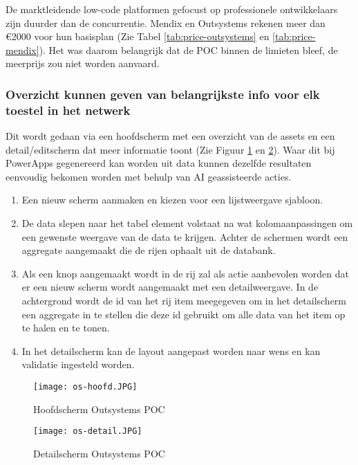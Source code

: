 De marktleidende low-code platformen gefocust op professionele ontwikkelaars zijn duurder dan de concurrentie. Mendix en Outsystems rekenen meer dan \euro2000 voor hun basisplan (Zie Tabel \ref{tab:price-outsystems} en \ref{tab:price-mendix}). Het was daarom belangrijk dat de POC binnen de limieten bleef, de meerprijs zou niet worden aanvaard.

\subsubsection{Overzicht kunnen geven van belangrijkste info voor elk toestel in het netwerk}

Dit wordt gedaan via een hoofdscherm met een overzicht van de assets en een detail/editscherm dat meer informatie toont (Zie Figuur \ref{fig:os-hoofd} en \ref{fig:os-detail}).
Waar dit bij PowerApps gegenereerd kan worden uit data kunnen dezelfde resultaten eenvoudig bekomen worden met behulp van AI geassisteerde acties.
\begin{enumerate}
    \item Een nieuw scherm aanmaken en kiezen voor een lijstweergave sjabloon.
    \item De data slepen naar het tabel element volstaat na wat kolomaanpassingen om een gewenste weergave van de data te krijgen. Achter de schermen wordt een aggregate aangemaakt die de rijen ophaalt uit de databank.
    \item Als een knop aangemaakt wordt in de rij zal als actie aanbevolen worden dat er een nieuw scherm wordt aangemaakt met een detailweergave. In de achtergrond wordt de id van het rij item meegegeven om in het detailscherm een aggregate in te stellen die deze id gebruikt om alle data van het item op te halen en te tonen.
    \item In het detailscherm kan de layout aangepast worden naar wens en kan validatie ingesteld worden.
\end{enumerate}

\begin{figure}[h!]
    \texttt{[image: os-hoofd.JPG]}
    \caption{Hoofdscherm Outsystems POC}
    \label{fig:os-hoofd}
\end{figure}

\begin{figure}[h!]
    \texttt{[image: os-detail.JPG]}
    \caption{Detailscherm Outsystems POC}
    \label{fig:os-detail}
\end{figure}

